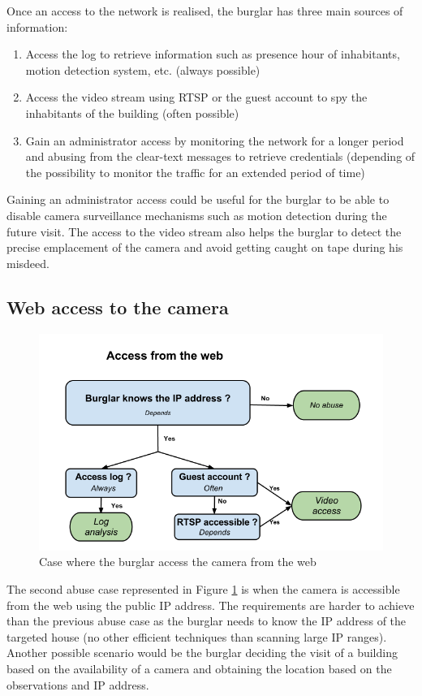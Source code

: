 Once an access to the network is realised, the burglar has three main sources of information:
\begin{enumerate}
\item Access the log to retrieve information such as presence hour of inhabitants, motion detection system, etc. (always possible)
\item Access the video stream using RTSP or the guest account to spy the inhabitants of the building (often possible)
\item Gain an administrator access by monitoring the network for a longer period and abusing from the clear-text messages to retrieve credentials (depending of the possibility to monitor the traffic for an extended period of time)
\end{enumerate}

Gaining an administrator access could be useful for the burglar to be able to disable camera surveillance mechanisms such as motion detection during the future visit.
The access to the video stream also helps the burglar to detect the precise emplacement of the camera and avoid getting caught on tape during his misdeed.

\subsection{Web access to the camera}

\begin{figure}[h]
  \centering
  \includegraphics[width=13cm]{images/burglar-outside.png}
  \caption{Case where the burglar access the camera from the web}
  \label{fig:burglar-outside}
\end{figure}

The second abuse case represented in Figure \ref{fig:burglar-outside} is when the camera is accessible from the web using the public IP address.
The requirements are harder to achieve than the previous abuse case as the burglar needs to know the IP address of the targeted house (no other efficient techniques than scanning large IP ranges).
Another possible scenario would be the burglar deciding the visit of a building based on the availability of a camera and obtaining the location based on the observations and IP address.\\

